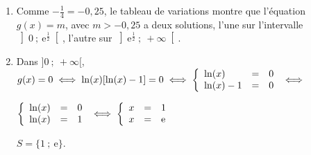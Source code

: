 \documentclass[10pt]{article}
\begin{document}
\begin{enumerate}
\item 
Comme $- \frac{1}{4} = - 0,25$, le tableau de variations montre que l'équation $g(x) = m$, avec $m > -0,25$ a deux solutions, l'une sur l'intervalle $\left]0~;~\text{e}^{\frac{1}{2}}\right[$, l'autre sur $\left]\text{e}^{\frac{1}{2}}~;~+ \infty\right[$.
\item 
Dans $]0~;~+ \infty[$, \, $g(x) = 0 \iff \ln (x) [\ln (x) - 1] = 0 \iff \left\{\begin{array}{l c l}
\ln (x)&=&0\\
\ln (x) - 1&=&0
\end{array}\right. \iff $

$\left\{\begin{array}{l c l}
\ln (x)&=&0\\
\ln (x) &=&1
\end{array}\right. \iff \left\{\begin{array}{l c l}
x&=&1\\
x &=&\text{e}
\end{array}\right.$

$S = \{1~;~\text{e}\}$.
\end{enumerate}
\end{document}
